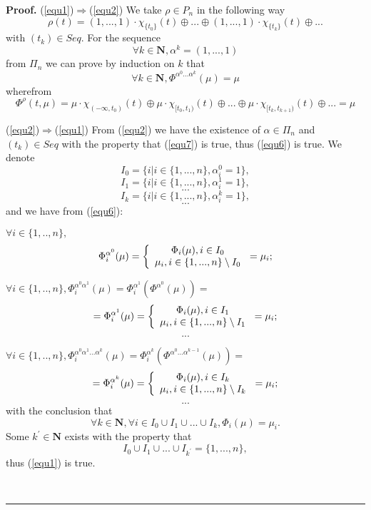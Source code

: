 \documentclass[12pt]{article}\usepackage{amsmath}
\newenvironment{proof}[1][Proof]{\textbf{#1.} }{\ \rule{0.5em}{0.5em}}
\begin{document}
\begin{proof}
(\ref{equ1})$\Longrightarrow$(\ref{equ2}) We take $\rho\in P_{n}$ in the
following way\[
\rho(t)=(1,...,1)\cdot\chi_{\{t_{0}\}}(t)\oplus...\oplus(1,...,1)\cdot
\chi_{\{t_{k}\}}(t)\oplus...
\]
with $(t_{k})\in Seq.$ For the sequence\[
\forall k\in\mathbf{N},\alpha^{k}=(1,...,1)
\]
from $\Pi_{n}$ we can prove by induction on $k$ that\begin{equation}
\forall k\in\mathbf{N},\Phi^{\alpha^{0}...\alpha^{k}}(\mu)=\mu\label{equ6}\end{equation}
wherefrom\begin{equation}
\Phi^{\rho}(t,\mu)=\mu\cdot\chi_{(-\infty,t_{0})}(t)\oplus\mu\cdot
\chi_{\lbrack t_{0},t_{1})}(t)\oplus...\oplus\mu\cdot\chi_{\lbrack
t_{k},t_{k+1})}(t)\oplus...=\mu\label{equ7}\end{equation}


(\ref{equ2})$\Longrightarrow$(\ref{equ1}) From (\ref{equ2}) we have the
existence of $\alpha\in\Pi_{n}$ and $(t_{k})\in Seq$ with the property that
(\ref{equ7}) is true, thus (\ref{equ6}) is true. We denote\[
I_{0}=\{i|i\in\{1,...,n\},\alpha_{i}^{0}=1\},
\]\[
I_{1}=\{i|i\in\{1,...,n\},\alpha_{i}^{1}=1\},
\]\[
...
\]\[
I_{k}=\{i|i\in\{1,...,n\},\alpha_{i}^{k}=1\},
\]\[
...
\]
and we have from (\ref{equ6}):

$\forall i\in\{1,..,n\},$\[
\Phi_{i}^{\alpha^{0}}(\mu)=\left\{
\begin{array}
[c]{c}\Phi_{i}(\mu),i\in I_{0}\\
\mu_{i},i\in\{1,...,n\}\setminus I_{0}\end{array}
\right.  =\mu_{i};
\]


$\forall i\in\{1,..,n\},\Phi_{i}^{\alpha^{0}\alpha^{1}}(\mu)=\Phi_{i}^{\alpha^{1}}(\Phi^{\alpha^{0}}(\mu))=$\[
=\Phi_{i}^{\alpha^{1}}(\mu)=\left\{
\begin{array}
[c]{c}\Phi_{i}(\mu),i\in I_{1}\\
\mu_{i},i\in\{1,...,n\}\setminus I_{1}\end{array}
\right.  =\mu_{i};
\]\[
...
\]


$\forall i\in\{1,..,n\},\Phi_{i}^{\alpha^{0}\alpha^{1}...\alpha^{k}}(\mu
)=\Phi_{i}^{\alpha^{k}}(\Phi^{\alpha^{0}...\alpha^{k-1}}(\mu))=$\[
=\Phi_{i}^{\alpha^{k}}(\mu)=\left\{
\begin{array}
[c]{c}\Phi_{i}(\mu),i\in I_{k}\\
\mu_{i},i\in\{1,...,n\}\setminus I_{k}\end{array}
\right.  =\mu_{i};
\]\[
...
\]
with the conclusion that\[
\forall k\in\mathbf{N},\forall i\in I_{0}\cup I_{1}\cup...\cup I_{k},\Phi
_{i}(\mu)=\mu_{i}.
\]
Some $k^{\prime}\in\mathbf{N}$ exists with the property that\[
I_{0}\cup I_{1}\cup...\cup I_{k^{\prime}}=\{1,...,n\},
\]
thus (\ref{equ1}) is true.


\end{proof}
\end{document}
